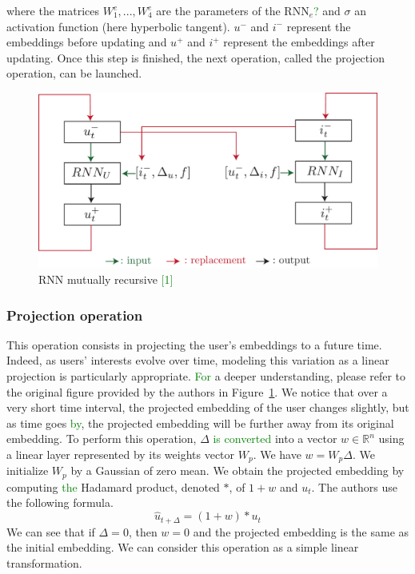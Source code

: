 where the matrices $W_1^e, ..., W_4^e$ are the parameters of the RNN$_e$\textcolor{green}{?} and $\sigma$ an activation function (here hyperbolic tangent). $u^-$ and $i^-$ represent the embeddings before updating and $u^+$ and $i^+$ represent the embeddings after updating. Once this step is finished, the next operation, called the projection operation, can be launched.

\begin{figure}[htbp]
   \centering
    \includegraphics[width=1.0\textwidth]{image/rnn_jodie.pdf}
    \caption{RNN mutually recursive \textcolor{green}{[1]}}
    \label{recursive RNNs}
\end{figure}

\subsubsection{Projection operation}

This operation consists in projecting the user's embeddings to a future time. %
Indeed, as users' interests evolve over time, modeling this variation as a linear projection is particularly appropriate. \textcolor{green}{For} %
a deeper understanding, please refer to the original figure provided by the authors in Figure~\ref{recursive RNNs}.
We notice that over a very short time interval, the projected embedding of the user changes slightly, but as time goes \textcolor{green}{by}, the projected embedding will be further away from its original embedding. To perform this operation, %
$\Delta$ \textcolor{green}{is converted} into a vector $w \in \mathbb{R}^n$ using a linear layer represented by its weights vector $W_p$. We have $w = W_p \Delta$.  We initialize $W_p$ by a Gaussian of zero mean. 
We obtain the projected embedding by computing \textcolor{green}{the} Hadamard product, denoted $*$, of $1+w$ and $u_t$. The authors use the following formula.
$$
\widehat u_{t+\Delta} = (1+w) * u_t
$$
We can see that if $\Delta = 0$, then $w=0$ and the projected embedding is the same as the initial embedding. We can consider this operation as a simple linear transformation.

